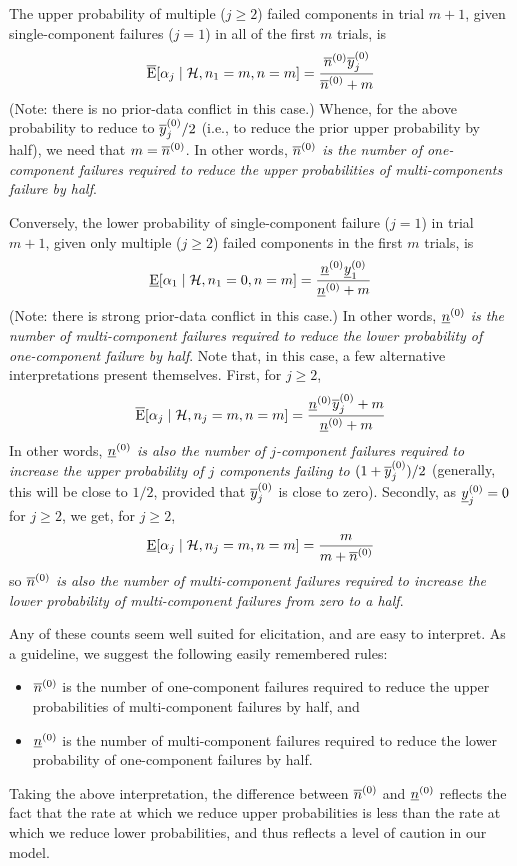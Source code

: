 The upper probability of multiple ($j\ge 2$) failed components in trial $m+1$,
given single-component failures ($j=1$) in all of the first $m$ trials, is
\begin{equation*}
  \overline{\operatorname{E}}[\alpha_j\mid\mathcal{H}, n_1=m, n=m] = \frac{\overline{n}^{(0)}\overline{y}^{(0)}_j}{\overline{n}^{(0)} + m}
\end{equation*}
(Note: there is no prior-data conflict in this case.)
Whence, for the above probability to reduce to $\overline{y}^{(0)}_j/2$
(i.e., to reduce the prior upper probability by half), we need that $m=\overline{n}^{(0)}$.
In other words, \emph{$\overline{n}^{(0)}$ is the number of one-component failures required
to reduce the upper probabilities of multi-components failure by half}.

Conversely, the lower probability of single-component failure ($j=1$) in trial $m+1$,
given only multiple ($j\ge 2$) failed components in the first $m$ trials,
is
\begin{equation*}
  \underline{\operatorname{E}}[\alpha_1\mid\mathcal{H}, n_1=0, n=m] = \frac{\underline{n}^{(0)}\underline{y}^{(0)}_1}{\underline{n}^{(0)} + m}
\end{equation*}
(Note: there is strong prior-data conflict in this case.)
%
In other words, \emph{$\underline{n}^{(0)}$ is the number of multi-component failures required
to reduce the lower probability of one-component failure by half}.
%
Note that, in this case, a few alternative interpretations present themselves.
First, for $j \ge 2$,
\begin{equation*}
  \overline{\operatorname{E}}[\alpha_j\mid\mathcal{H}, n_j=m, n=m] = \frac{\underline{n}^{(0)}\overline{y}^{(0)}_j + m}{\underline{n}^{(0)} + m}
\end{equation*}
In other words, \emph{$\underline{n}^{(0)}$ is also the number of $j$-component failures required
to increase the upper probability of $j$ components failing to $(1+\overline{y}^{(0)}_j)/2$}
(generally, this will be close to $1/2$, provided that $\overline{y}^{(0)}_j$ is close to zero).
%
Secondly, as $\underline{y}^{(0)}_j = 0$ for $j \ge 2$, we get, for $j \ge 2$,
\begin{equation*}
  \underline{\operatorname{E}}[\alpha_j\mid\mathcal{H}, n_j=m, n=m] = \frac{m}{m+\overline{n}^{(0)}}
\end{equation*}
so \emph{$\overline{n}^{(0)}$ is also the number of multi-component failures required
to increase the lower probability of multi-component failures from zero to a half}.

Any of these counts seem well suited for elicitation, and are easy to interpret.
As a guideline, we suggest the following easily remembered rules:
\begin{itemize}
\item $\overline{n}^{(0)}$ is the number of one-component failures required to reduce
the upper probabilities of multi-component failures by half, and
\item $\underline{n}^{(0)}$ is the number of multi-component failures required to reduce
the lower probability of one-component failures by half.
\end{itemize}
Taking the above interpretation, the difference between $\overline{n}^{(0)}$ and $\underline{n}^{(0)}$
reflects the fact that the rate at which we reduce upper probabilities
is less than the rate at which we reduce lower probabilities,
and thus reflects a level of caution in our model.

